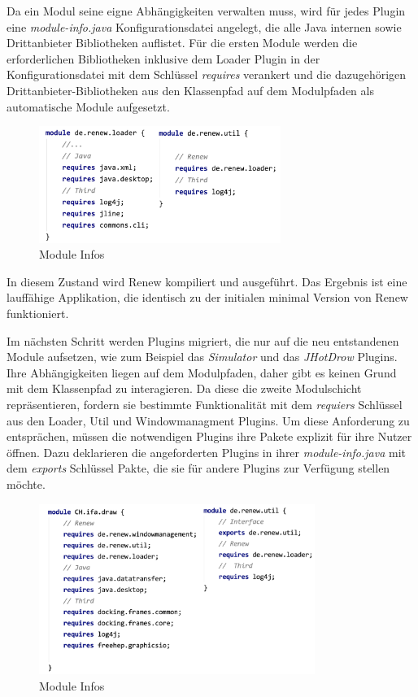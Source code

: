 	Da ein Modul seine eigne Abhängigkeiten verwalten muss, wird für jedes Plugin eine \textit{module-info.java} Konfigurationsdatei angelegt, die alle Java internen sowie Drittanbieter Bibliotheken auflistet. Für die ersten Module werden die erforderlichen Bibliotheken inklusive dem Loader Plugin in der Konfigurationsdatei mit dem Schlüssel \textit{requires} verankert und die dazugehörigen Drittanbieter-Bibliotheken aus den Klassenpfad auf dem Modulpfaden als automatische Module aufgesetzt.

	\begin{figure}[h!]
	  \centering
	  \includegraphics[width=0.7\textwidth]{material/images/loaderUtil-info.png}
	  \caption{Module Infos}
	  \label{fig:loaderUtil}
	\end{figure}

	In diesem Zustand wird Renew kompiliert und ausgeführt. Das Ergebnis ist eine lauffähige Applikation, die identisch zu der initialen minimal Version von Renew funktioniert. \bigbreak

	Im nächsten Schritt werden Plugins migriert, die nur auf die neu entstandenen Module aufsetzen, wie zum Beispiel das \textit{Simulator} und das \textit{JHotDrow} Plugins. Ihre Abhängigkeiten liegen auf dem Modulpfaden, daher gibt es keinen Grund mit dem Klassenpfad zu interagieren. \newline
	Da diese die zweite Modulschicht repräsentieren, fordern sie bestimmte Funktionalität mit dem \textit{requiers} Schlüssel aus den Loader, Util und Windowmanagment Plugins. Um diese Anforderung zu entsprächen, müssen die notwendigen Plugins ihre Pakete  explizit für ihre Nutzer öffnen. Dazu deklarieren die angeforderten Plugins in ihrer \textit{module-info.java} mit dem \textit{exports} Schlüssel Pakte, die sie für andere Plugins zur Verfügung stellen möchte.

	\begin{figure}[h!]
	  \centering
	  \includegraphics[width=0.8\textwidth]{material/images/utilCH-info.png}
	  \caption{Module Infos}
	  \label{fig:utilCH}
	\end{figure}

